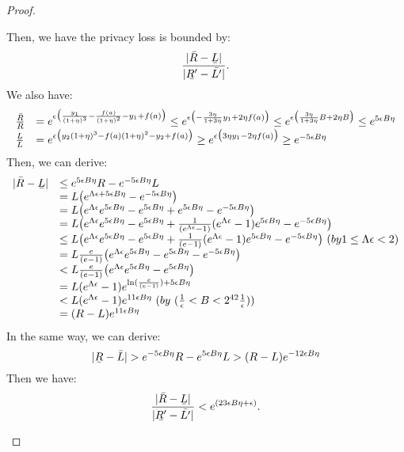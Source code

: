 \documentclass[a4paper,11pt]{article}
\begin{document}
\begin{proof}
\begin{itemize}
		Then, we have the privacy loss is bounded by:
		\[
		\frac{|\bar{R} - \ubar{L}|}{|\ubar{R'} - \bar{L'}|}.		
		\]
		We also have:
		\[
		\begin{array}{ll}
		\frac{\bar{R}}{R} 
		& = e^{\epsilon
		\big(\frac{y_1}{(1 + \eta)^3} - \frac{f(a)}{(1 + \eta) ^2} 
		- y_1 + f(a) \big)}
		 \leq e^{\epsilon
		\big(- \frac{3 \eta}{1 +3 \eta}y_1 + 2 \eta f(a) \big)}
		 \leq e^{\epsilon
		\big(\frac{3 \eta}{1 +3 \eta}B + 2 \eta B \big)}
		\leq e^{5 \epsilon B \eta}\\
%
		\frac{\ubar{L}}{L} 
		& = e^{\epsilon
		\big({y_2}{(1 + \eta)^3} - {f(a)}{(1 + \eta) ^2} 
		- y_2 + f(a) \big)}
		 \geq e^{\epsilon
		\big({3 \eta}y_1 - 2 \eta f(a) \big)}
		\geq e^{-5 \epsilon B \eta}\\
		\end{array}
		\]
		Then, we can derive:
		\[
		\begin{array}{ll}
		|\bar{R} - \ubar{L}| 
		& \leq e^{5 \epsilon B \eta}R - e^{-5 \epsilon B \eta} L \\
		& = L \big(  e^{ \Lambda\epsilon + 5 \epsilon B \eta} 
		- e^{-5 \epsilon B \eta} \big)\\
		& = L \big( e^{ \Lambda\epsilon} e^{5 \epsilon B \eta}
		-e^{5 \epsilon B \eta}
		+  e^{5 \epsilon B \eta}
		- e^{-5 \epsilon B \eta} \big)\\
		& = L \big( e^{ \Lambda\epsilon} e^{5 \epsilon B \eta}
		- e^{5 \epsilon B \eta}
		+  \frac{1}{(e^{ \Lambda\epsilon} - 1)}
		(e^{ \Lambda\epsilon} - 1)e^{5 \epsilon B \eta}
		- e^{-5 \epsilon B \eta} \big)\\
		& \leq L \big( e^{ \Lambda\epsilon} e^{5 \epsilon B \eta}
		- e^{5 \epsilon B \eta}
		+  \frac{1}{(e - 1)}
		(e^{ \Lambda\epsilon} - 1)e^{5 \epsilon B \eta}
		- e^{-5 \epsilon B \eta} \big) ~( by 1 \leq \Lambda \epsilon < 2)\\ 
		& = L  \frac{e}{(e - 1)} \big( e^{ \Lambda\epsilon} e^{5 \epsilon B \eta}
		- e^{5 \epsilon B \eta}
		- e^{-5 \epsilon B \eta} \big)\\
		& < L  \frac{e}{(e - 1)} \big( e^{ \Lambda\epsilon} e^{5 \epsilon B \eta}
		- e^{5 \epsilon B \eta} \big)\\
		& = L (e^{ \Lambda\epsilon} -  1) e^{\ln(\frac{e}{(e - 1)}) + 5 \epsilon B \eta}\\
		& < L (e^{ \Lambda\epsilon} -  1)e^{11 \epsilon B \eta}~ (by ~ ( \frac{1}{\epsilon} < B < 2^{42} \frac{1}{\epsilon} )) \\
		& = (R - L)e^{11 \epsilon B \eta}
		\end{array}
		\]
		In the same way, we can derive:
		\[
		|\ubar{R} - \bar{L}| > e^{-5 \epsilon B\eta} R - e^{5 \epsilon B\eta} L
		> (R - L)e^{- 12 \epsilon B \eta}
		\]
		Then we have:
		\[
		\frac{|\bar{R} - \ubar{L}|}{|\ubar{R'} - \bar{L'}|}
		< e^{(23 \epsilon B \eta + \epsilon)}.		
		\]
%


\end{itemize}
\end{proof}
\end{document}
